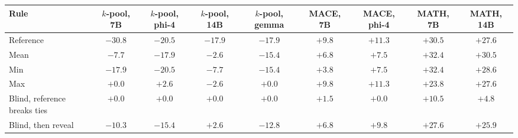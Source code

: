 \begin{tabular}{lcccccccc}
\toprule
Rule & $k$-pool, 7B & $k$-pool, phi-4 & $k$-pool, 14B & $k$-pool, gemma & \textsc{MACE}, 7B & \textsc{MACE}, phi-4 & MATH, 7B & MATH, 14B \\
\midrule
Reference & $-30.8$ & $-20.5$ & $-17.9$ & $-17.9$ & $+9.8$ & $+11.3$ & $+30.5$ & $+27.6$ \\
Mean & $-7.7$ & $-17.9$ & $-2.6$ & $-15.4$ & $+6.8$ & $+7.5$ & $+32.4$ & $+30.5$ \\
Min & $-17.9$ & $-20.5$ & $-7.7$ & $-15.4$ & $+3.8$ & $+7.5$ & $+32.4$ & $+28.6$ \\
Max & $+0.0$ & $+2.6$ & $-2.6$ & $+0.0$ & $+9.8$ & $+11.3$ & $+23.8$ & $+27.6$ \\
Blind, reference breaks ties & $+0.0$ & $+0.0$ & $+0.0$ & $+0.0$ & $+1.5$ & $+0.0$ & $+10.5$ & $+4.8$ \\
Blind, then reveal & $-10.3$ & $-15.4$ & $+2.6$ & $-12.8$ & $+6.8$ & $+9.8$ & $+27.6$ & $+25.9$ \\
\bottomrule
\end{tabular}
